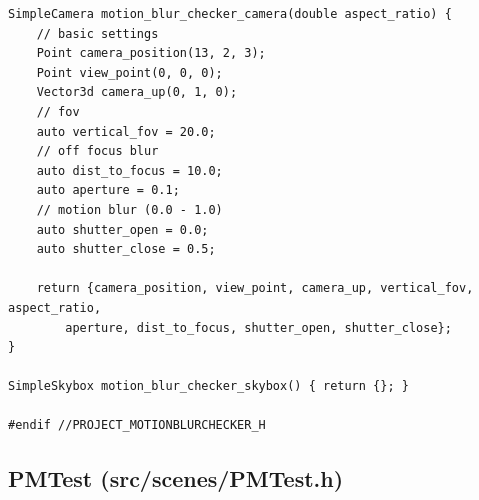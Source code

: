 \documentclass[utf8]{article}
\begin{document}
\begin{lstlisting}[style=CStyle]
SimpleCamera motion_blur_checker_camera(double aspect_ratio) {
	// basic settings
	Point camera_position(13, 2, 3);
	Point view_point(0, 0, 0);
	Vector3d camera_up(0, 1, 0);
	// fov
	auto vertical_fov = 20.0;
	// off focus blur
	auto dist_to_focus = 10.0;
	auto aperture = 0.1;
	// motion blur (0.0 - 1.0)
	auto shutter_open = 0.0;
	auto shutter_close = 0.5;
	
	return {camera_position, view_point, camera_up, vertical_fov, aspect_ratio,
		aperture, dist_to_focus, shutter_open, shutter_close};
}

SimpleSkybox motion_blur_checker_skybox() { return {}; }

#endif //PROJECT_MOTIONBLURCHECKER_H

\end{lstlisting}
\subsection{PMTest (src/scenes/PMTest.h)}
\end{document}
